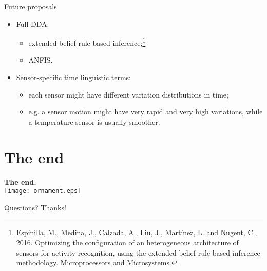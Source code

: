 \documentclass[9pt, handout]{beamer}
\begin{document}
      \begin{frame}{Future proposals}
        \pause
        \begin{itemize}
          \item Full DDA:
          \begin{itemize}
            \item extended belief rule-based inference;\footnote{Espinilla, M., Medina, J., Calzada, A., Liu, J., Martínez, L. and Nugent, C., 2016. Optimizing the configuration of an heterogeneous architecture of sensors for activity recognition, using the extended belief rule-based inference methodology. Microprocessors and Microsystems.}
            \item ANFIS.
          \end{itemize}
          \pause
          \item Sensor-specific time linguistic terms:
          \begin{itemize}
            \item each sensor might have different variation distributions in time;
            \item e.g. a sensor motion might have very rapid and very high variations, while a temperature sensor is usually smoother.
          \end{itemize}
        \end{itemize}
      \end{frame}
      
  \section*{The end}
    \begin{frame}
      \begin{center}
      	\textbf{\calligra\Huge The end.}\\
        \texttt{[image: ornament.eps]}
        
      	\pause
      	\vspace{1cm}
      	{\huge\calligra Questions?\pause{} Thanks!}
      \end{center}
    \end{frame}
      
\end{document}
